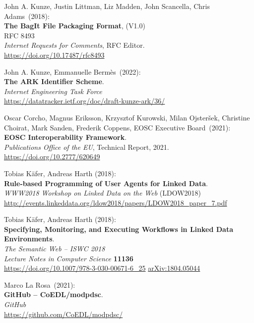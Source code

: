 \begin{thebibliography}{9}
John A. Kunze, Justin Littman, Liz Madden, John Scancella, Chris Adams~(2018): \\
\textbf{The BagIt File Packaging Format}, (V1.0)\\
RFC 8493\\
\emph{Internet Requests for Comments}, RFC Editor.\\
\url{https://doi.org/10.17487/rfc8493}

John A. Kunze, Emmanuelle Bermès~(2022): \\
\textbf{{The ARK Identifier Scheme}}.\\
\emph{Internet Engineering Task Force}\\
\url{https://datatracker.ietf.org/doc/draft-kunze-ark/36/}

Oscar Corcho, Magnus Eriksson, Krzysztof Kurowski, Milan Ojsteršek,
Christine Choirat, Mark Sanden, Frederik Coppens, EOSC Executive
Board~(2021): \\
\textbf{EOSC Interoperability Framework}.\\
\emph{Publications Office of the EU}, Technical Report, 2021.\\
\url{https://doi.org/10.2777/620649}

Tobias Käfer, Andreas Harth (2018): \\
\textbf{Rule-based Programming of User Agents for Linked Data}.\\
\emph{WWW2018 Workshop on Linked Data on the Web} (LDOW2018) \\
\url{http://events.linkeddata.org/ldow2018/papers/LDOW2018_paper_7.pdf}

Tobias Käfer, Andreas Harth (2018):\\
\textbf{Specifying, Monitoring, and Executing Workflows in Linked Data Environments}.\\
\emph{The Semantic Web – ISWC 2018}\\
\emph{Lecture Notes in Computer Science} \textbf{11136}\\
\url{https://doi.org/10.1007/978-3-030-00671-6_25}
\href{https://arxiv.org/abs/1804.05044}{arXiv:1804.05044}

Marco La Rosa~(2021): \\
\textbf{GitHub -- CoEDL/modpdsc}. \\
\emph{GitHub} \\
\url{https://github.com/CoEDL/modpdsc/}


\end{thebibliography}
